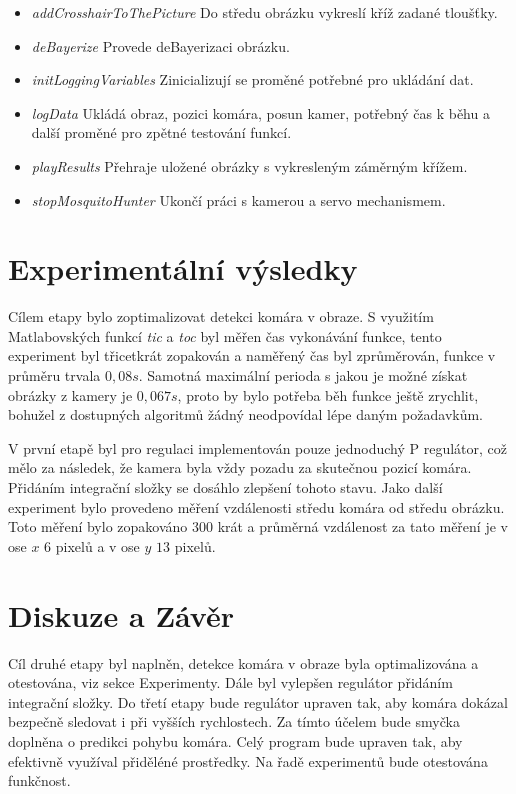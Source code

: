 \documentclass[a4paper,10pt]{article}
\begin{document}
		\begin{itemize}
				\item \textit{addCrosshairToThePicture} Do středu obrázku vykreslí kříž zadané tloušťky. 
				\item \textit{deBayerize} Provede deBayerizaci obrázku.
				\item \textit{initLoggingVariables} Zinicializují se proměné potřebné pro ukládání dat.
				\item \textit{logData} Ukládá obraz, pozici komára, posun kamer, potřebný čas k běhu a další proměné pro zpětné testování funkcí.
				\item \textit{playResults} Přehraje uložené obrázky s vykresleným záměrným křížem.
				\item \textit{stopMosquitoHunter} Ukončí práci s kamerou a servo mechanismem.
		\end{itemize}

\section{Experimentální výsledky}
		Cílem etapy bylo zoptimalizovat detekci komára v obraze. 
		S využitím Matlabovských funkcí \textit{tic} a \textit{toc} byl měřen čas vykonávání funkce, 
		tento experiment byl třicetkrát zopakován a naměřený čas byl zprůměrován, funkce v průměru trvala $0,08 s$. 
		Samotná maximální perioda s jakou je možné získat obrázky z kamery je $0, 067s$, proto by bylo potřeba běh funkce ještě zrychlit, bohužel z dostupných algoritmů žádný neodpovídal lépe daným požadavkům. 

		V první etapě byl pro regulaci implementován pouze jednoduchý P regulátor, což mělo za následek, 
		že kamera byla vždy pozadu za skutečnou pozicí komára. Přidáním integrační složky se dosáhlo zlepšení tohoto stavu. 
		Jako další experiment bylo provedeno měření vzdálenosti středu komára od středu obrázku. 
		Toto měření bylo zopakováno 300 krát a průměrná vzdálenost za tato měření je v ose $x$ $6$ pixelů a v ose $y$ $13$ pixelů.



\section{Diskuze a Závěr}
		Cíl druhé etapy byl naplněn, detekce komára v obraze byla optimalizována a otestována, viz sekce Experimenty. 
		Dále byl vylepšen regulátor přidáním integrační složky. Do třetí etapy bude regulátor upraven tak, 
		aby komára dokázal bezpečně sledovat i při vyšších rychlostech.
		Za tímto účelem bude smyčka doplněna o predikci pohybu komára. Celý program bude upraven tak, aby efektivně využíval přiděléné prostředky.
		Na řadě experimentů bude otestována funkčnost. 



\end{document}
